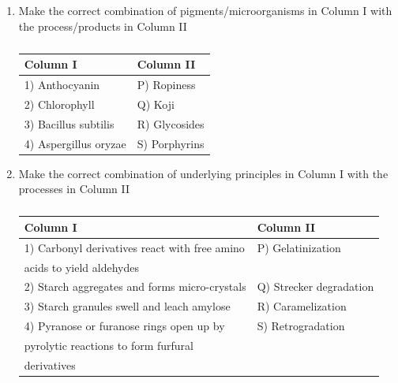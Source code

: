 \documentclass[a4paper,10pt]{article}
\begin{document}
\begin{enumerate}
    \item Make the correct combination of pigments/microorganisms in Column I with the process/products in Column II
    \begin{table}[h!] \centering \caption*{} \label{tab:q13_food}
        \begin{tabular}{ll} \hline
            \textbf{Column I} & \textbf{Column II} \\ \hline
            1) Anthocyanin & P) Ropiness \\
            2) Chlorophyll & Q) Koji \\
            3) Bacillus subtilis & R) Glycosides \\
            4) Aspergillus oryzae & S) Porphyrins \\ \hline
        \end{tabular}
    \end{table}
    
    \hfill{}
    \begin{enumerate}
    \end{enumerate}
    
    \item Make the correct combination of underlying principles in Column I with the processes in Column II
    \begin{table}[h!] \centering \caption*{} \label{tab:q14_food}
        \begin{tabular}{ll} \hline
            \textbf{Column I} & \textbf{Column II} \\ \hline
            1) Carbonyl derivatives react with free amino & P) Gelatinization \\
            \hspace{3mm} acids to yield aldehydes & \\
            2) Starch aggregates and forms micro-crystals & Q) Strecker degradation \\
            3) Starch granules swell and leach amylose & R) Caramelization \\
            4) Pyranose or furanose rings open up by & S) Retrogradation \\
            \hspace{3mm} pyrolytic reactions to form furfural & \\
            \hspace{3mm} derivatives & \\ \hline
        \end{tabular}
    \end{table}
    

\end{enumerate}
\end{document}
